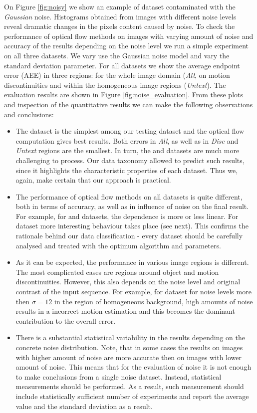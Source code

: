 On Figure \ref{fig:noisy} we show an example of \rub dataset contaminated with the \textit{Gaussian} noise. Histograms obtained from images with different noise levels reveal dramatic changes in the pixels content caused by noise. To check the performance of optical flow methods on images with varying amount of noise and accuracy of the results depending on the noise level we run a simple experiment on all three datasets. We vary use the Gaussian noise model and vary the standard deviation parameter. For all datasets we show the average endpoint error (AEE) in three regions: for the whole image domain (\textit{All}, on motion discontinuities and within the homogeneous image regions (\textit{Untext}). The evaluation results are shown in Figure \ref{fig:noise_evaluation}. From these plots and inspection of the quantitative results we can make the following observations and conclusions:

\begin{itemize}
	\item The \mar dataset is the simplest among our testing dataset and the optical flow computation gives best results. Both errors in \textit{All}, as well as in \textit{Disc} and \textit{Untext} regions are the smallest. In turn, the \rub and \hyd datasets are much more challenging to process. Our data taxonomy allowed to predict such results, since it highlights the characteristic properties of each dataset. Thus we, again, make certain that our approach is practical.
	
	\item The performance of optical flow methods on all datasets is quite different, both in terms of accuracy, as well as in influence of noise on the final result. For example, for \rub and \mar datasets, the dependence is more or less linear. For \hyd dataset more interesting behaviour takes place (see next). This confirms the rationale behind our data classification - every dataset should be carefully analysed and treated with the optimum algorithm and parameters.
	
	\item As it can be expected, the performance in various image regions is different. The most complicated cases are regions around object and motion discontinuities. However, this also depends on the noise level and original contrast of the input sequence. For example, for \hyd dataset for noise levels more then $\sigma=12$  in the region of homogeneous background, high amounts of noise results in a incorrect motion estimation and this becomes the dominant contribution to the overall error.
		
	\item There is a substantial statistical variability in the results depending on the concrete noise distribution. Note, that in some cases the results on images with higher amount of noise are more accurate then on images with lower amount of noise. This means that for the evaluation of noise it is not enough to make conclusions from a single noise dataset. Instead, statistical measurements should be performed. As a result, such measurement should include statistically sufficient number of experiments and report the average value and the standard deviation as a result.   
\end{itemize}

